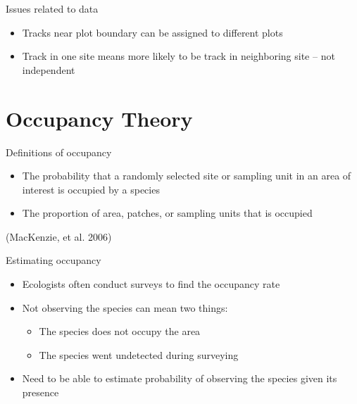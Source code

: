 \documentclass{beamer}
\begin{document}
{
	\begin{frame}
	\end{frame}
}

\begin{frame}{Issues related to data}
	\begin{itemize}
		\item Tracks near plot boundary can be assigned to different plots
		\item Track in one site means more likely to be track in neighboring
		site -- not independent
	\end{itemize}
\end{frame}

\section{Occupancy Theory}
\begin{frame}{Definitions of occupancy}
	\begin{itemize}
		\item The probability that a randomly selected site or sampling unit in
		an area of interest is occupied by a species
		\item The proportion of area, patches, or sampling units that is
		occupied
	\end{itemize}
	(MacKenzie, et al. 2006)
\end{frame}

\begin{frame}{Estimating occupancy}
	\begin{itemize}
		\item Ecologists often conduct surveys to find the occupancy rate
		\item Not observing the species can mean two things:
		\begin{itemize}
			\item The species does not occupy the area
			\item The species went undetected during surveying
		\end{itemize}
		\item Need to be able to estimate probability of observing the species
		given its presence
	\end{itemize}
\end{frame}
\end{document}
